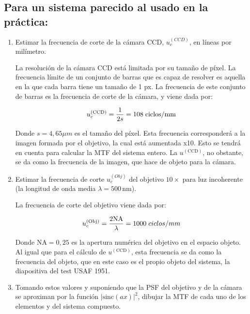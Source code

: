 \documentclass{./packages/optica-article}
\newcommand{\sinc}{\textrm{sinc}}
\begin{document}
\subsection{Para un sistema parecido al usado en la práctica:}\label{sec:cuestion:mtf}
\begin{enumerate}
	\item Estimar la frecuencia de corte de la cámara CCD, $u_{c}^{(CCD)}$, en líneas por milímetro.

	      La resolución de la cámara CCD está limitada por su tamaño de píxel. La frecuencia límite de un conjunto de barras que es capaz de resolver es aquella en la que cada barra tiene un tamaño de 1 px. La frecuencia de este conjunto de barras es la frecuencia de corte de la cámara, y viene dada por:

	      \begin{equation}
		      u_c^{(\textrm{CCD})} = \frac{1}{2s} = 108 \flatfrac{\textrm{ciclos}}{\textrm{mm}}
	      \end{equation}

	      Donde $s=4,65 \mu m$ es el tamaño del píxel. Esta frecuencia corresponderá a la imagen formada por el objetivo, la cual está aumentada x10. Esto se tendrá en cuenta para calcular la MTF del sistema entero. La $u^{(\textrm{CCD})}$, no obstante, se da como la frecuencia de la imagen, que hace de objeto para la cámara.

	\item Estimar la frecuencia de corte $u_{c}^{(Obj)}$ del objetivo $10\times$ para luz incoherente (la longitud de onda media $\lambda=500\,\unit{\nano\metre}$).

	      La frecuencia de corte del objetivo viene dada por:

	      \begin{equation}
		      u_c^{(\textrm{Obj})} = \frac{2 \textrm{NA}}{\lambda} = 1000 \flatfrac{ciclos}{mm}
	      \end{equation}

	      Donde $\textrm{NA}=0,25$ es la apertura numérica del objetivo en el espacio objeto. Al igual que para el cálculo de $u^{(\textrm{CCD})}$, esta frecuencia se da como la frecuencia del objeto, que en este caso es el propio objeto del sistema, la diapositiva del test USAF 1951.

	\item Tomando estos valores y suponiendo que la PSF del objetivo y de la cámara se aproximan por la función $|\sinc(ax)|^2$, dibujar la MTF de cada uno de los elementos y del sistema compuesto.


\end{enumerate}
\end{document}
